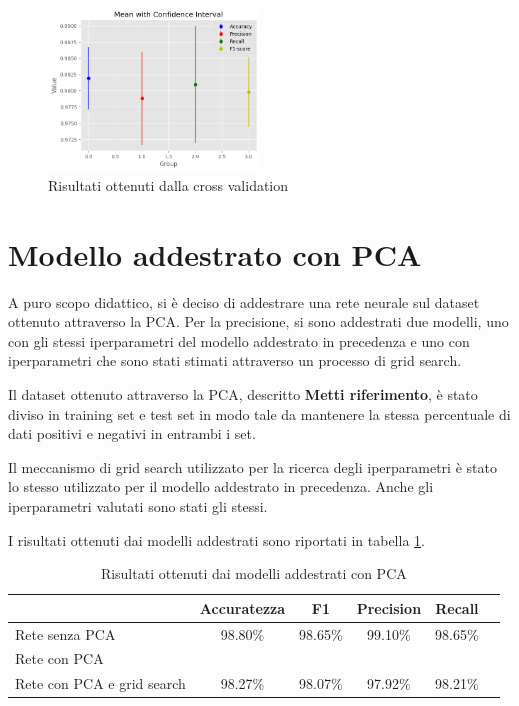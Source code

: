 \begin{figure}[!ht]
    \centering
    \includegraphics[width=0.5\textwidth]{img/rete/intervalli_confidenza.png}
    \caption{Risultati ottenuti dalla cross validation}
    \label{fig:risultatiCrossValidation}
\end{figure}
\section{Modello addestrato con PCA}
A puro scopo didattico, si è deciso di addestrare una rete neurale sul dataset
ottenuto attraverso la PCA. Per la precisione, si sono addestrati due modelli,
uno con gli stessi iperparametri del modello addestrato in precedenza e uno con
iperparametri che sono stati stimati attraverso un processo di grid search.

Il dataset ottenuto attraverso la PCA, descritto \textbf{Metti riferimento}, è
stato diviso in training set e test set in modo tale da mantenere la stessa
percentuale di dati positivi e negativi in entrambi i set.

Il meccanismo di grid search utilizzato per la ricerca degli iperparametri è
stato lo stesso utilizzato per il modello addestrato in precedenza. Anche
gli iperparametri valutati sono stati gli stessi.

I risultati ottenuti dai modelli addestrati sono riportati in tabella
\ref{tab:risultatiReteNeuralePCA}.

\begin{table}[ht]
    \centering
    \begin{tabular}{@{}lccccc@{}}
        \toprule
        \rowcolor[HTML]{EFEFEF}
        \multicolumn{1}{c}{\cellcolor[HTML]{EFEFEF}\textbf{Modello}} & \textbf{Accuratezza} & \textbf{F1} & \textbf{Precision} & \textbf{Recall} \\ \midrule
        Rete senza PCA                                               & 98.80\%              & 98.65\%     & 99.10\%            & 98.65\%         \\
        Rete con PCA                                                 &                      &             &                    &                 \\
        Rete con PCA e grid search                                   & 98.27\%              & 98.07\%     & 97.92\%            & 98.21\%         \\ \bottomrule
    \end{tabular}
    \caption{Risultati ottenuti dai modelli addestrati con PCA}
    \label{tab:risultatiReteNeuralePCA}
\end{table}
